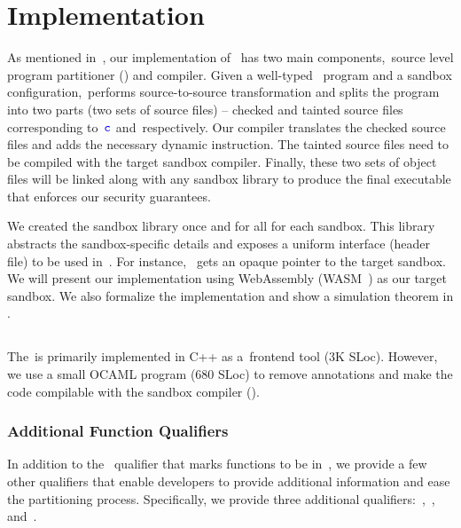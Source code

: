 \section{Implementation} \label{sec:implementation}
As mentioned in~, our implementation of~\systemname{} has two main components,~\ie source level program partitioner (\sourcerewriter) and compiler.
Given a well-typed~\systemname{} program and a sandbox configuration,~\sourcerewriter performs source-to-source transformation and splits the program into two parts (\ie two sets of source files) -- checked and tainted source files corresponding to~$\textcolor{blue}{\texttt{c}}$ and~\ucregion respectively.
Our compiler translates the checked source files and adds the necessary dynamic instruction.
The tainted source files need to be compiled with the target sandbox compiler.
Finally, these two sets of object files will be linked along with any sandbox library to produce the final executable that enforces our security guarantees.

We created the sandbox library once and for all for each sandbox.
This library abstracts the sandbox-specific details and exposes a uniform interface (header file) to be used in~\cregion.
For instance,~ gets an opaque pointer to the target sandbox.
We will present our implementation using WebAssembly (WASM~\cite{bosamiya2020webassembly}) as our target sandbox.
We also formalize the implementation and show a simulation theorem in .

\subsection{\sourcerewriter} \label{subsec:checkmate}
The~\sourcerewriter is primarily implemented in C++ as a~\clang frontend tool (3K SLoc).
However, we use a small OCAML program (680 SLoc) to remove annotations and make the code compilable with the sandbox compiler ().

\subsubsection{Additional Function Qualifiers}
\label{subsubsec:addfuncqual}
In addition to the~ qualifier that marks functions to be in~\ucregion, we provide a few other qualifiers that enable developers to provide additional information and ease the partitioning process.
Specifically, we provide three additional qualifiers:~,~, and~.

